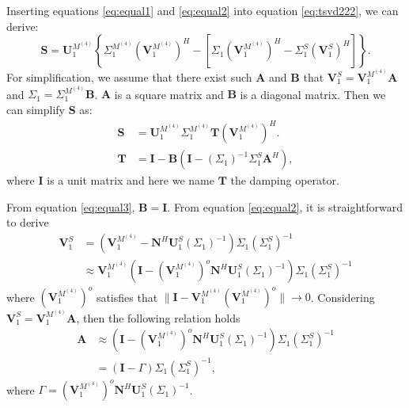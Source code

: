 Inserting equations \ref{eq:equal1} and \ref{eq:equal2} into equation \ref{eq:tsvd222}, we can derive:
\begin{equation}
\label{eq:S22}
\mathbf{S} =\mathbf{U}_1^{M^{(4)}}\left\{\Sigma_1^{M^{(4)}}(\mathbf{V}_1^{M^{(4)}})^H- \left[\Sigma_1(\mathbf{V}_1^{M^{(4)}})^H-\Sigma_1^S(\mathbf{V}_1^S)^H\right]\right\}.
\end{equation}
For simplification, we assume that there exist such $\mathbf{A}$ and $\mathbf{B}$ that $\mathbf{V}_1^S=\mathbf{V}_1^{M^{(4)}}\mathbf{A}$ and $\Sigma_1= \Sigma_1^{M^{(4)}}\mathbf{B}$. $\mathbf{A}$ is a square matrix and $\mathbf{B}$ is a diagonal matrix. Then we can simplify $\mathbf{S}$ as:
\begin{align}
\label{eq:S3}
\mathbf{S} &= \mathbf{U}_1^{M^{(4)}}\Sigma_1^{M^{(4)}}\mathbf{T}\left(\mathbf{V}_1^{M^{(4)}}\right)^H.\\
\label{eq:T}
\mathbf{T} &= \mathbf{I} - \mathbf{B}\left(\mathbf{I}-(\Sigma_1)^{-1}\Sigma_1^S\mathbf{A}^H\right),
\end{align}
where $\mathbf{I}$ is a unit matrix and here we name $\mathbf{T}$ the damping operator.

From equation \ref{eq:equal3}, $\mathbf{B}=\mathbf{I}$.
From equation \ref{eq:equal2}, it is straightforward to derive
\begin{equation}
\label{eq:Ader0}
\begin{split}
\mathbf{V}_1^S&=(\mathbf{V}_1^{M^{(4)}}-\mathbf{N}^H\mathbf{U}_1^S(\Sigma_1)^{-1})\Sigma_1(\Sigma_1^S)^{-1}\\
&\approx \mathbf{V}_1^{M^{(4)}}(\mathbf{I}-(\mathbf{V}_1^{M^{(4)}})^{o}\mathbf{N}^H\mathbf{U}_1^S(\Sigma_1)^{-1})\Sigma_1(\Sigma_1^S)^{-1}
\end{split}
\end{equation}
where $(\mathbf{V}_1^{M^{(4)}})^{o}$ satisfies that $\parallel\mathbf{I}-\mathbf{V}_1^{M^{(4)}}(\mathbf{V}_1^{M^{(4)}})^{o} \parallel\rightarrow 0$. Considering $\mathbf{V}_1^S=\mathbf{V}_1^{M^{(4)}}\mathbf{A}$, then the following relation holds
\begin{equation}
\label{eq:Ader}
\begin{split}
\mathbf{A}&\approx (\mathbf{I}-(\mathbf{V}_1^{M^{(4)}})^{o}\mathbf{N}^H\mathbf{U}_1^S(\Sigma_1)^{-1})\Sigma_1(\Sigma_1^S)^{-1}\\
&=(\mathbf{I}-\Gamma)\Sigma_1(\Sigma_1^S)^{-1},
\end{split}
\end{equation}
where $\Gamma=(\mathbf{V}_1^{M^{(4)}})^{o}\mathbf{N}^H\mathbf{U}_1^S(\Sigma_1)^{-1}$.


